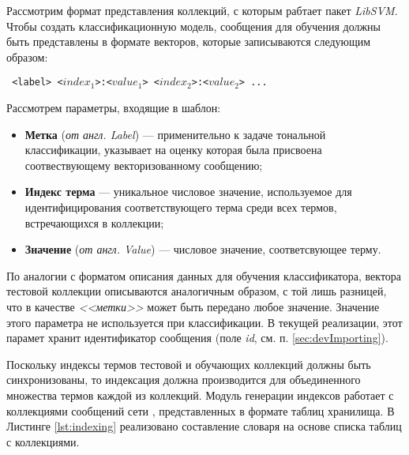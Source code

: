    Рассмотрим формат представления коллекций, с которым рабтает пакет {\it LibSVM}.
    Чтобы создать классификационную модель, сообщения для обучения должны быть
    представлены в формате векторов, которые записываются следующим образом:
    \begin{center}
        \tt
        <label> <$index_1$>:<$value_1$> <$index_2$>:<$value_2$> ...
    \end{center}

    Рассмотрем параметры, входящие в шаблон:
    \begin{itemize}
        \item {\bf Метка} ({\it от англ. Label}) --- применительно к задаче
        тональной классификации, указывает на оценку которая была присвоена
        соотвествующему векторизованному сообщению;
        \item {\bf Индекс терма} --- уникальное числовое значение, используемое
        для идентифицирования соответствующего терма среди всех термов, встречающихся
        в коллекции;
        \item {\bf Значение} ({\it от англ. Value}) --- числовое значение,
        соответсвующее терму.
    \end{itemize}

    По аналогии с форматом описания данных для обучения классификатора, вектора
    тестовой коллекции описываются аналогичным образом, с той лишь разницей, что
    в качестве {\it <<метки>>} может быть передано любое значение.
    Значение этого параметра не используется при классификации.
    В текущей реализации, этот парамет хранит идентификатор сообщения (поле
    {\it id}, см. п. \ref{sec:devImporting}).

    Поскольку индексы термов тестовой и обучающих коллекций должны быть
    синхронизованы, то индексация должна производится для объединенного
    множества термов каждой из коллекций.
    Модуль генерации индексов работает с коллекциями сообщений сети \twitter,
    представленных в формате таблиц хранилища. В Листинге \ref{lst:indexing}
    реализовано составление словаря на основе списка таблиц с коллекциями.

    \lstset{style=python}
    

